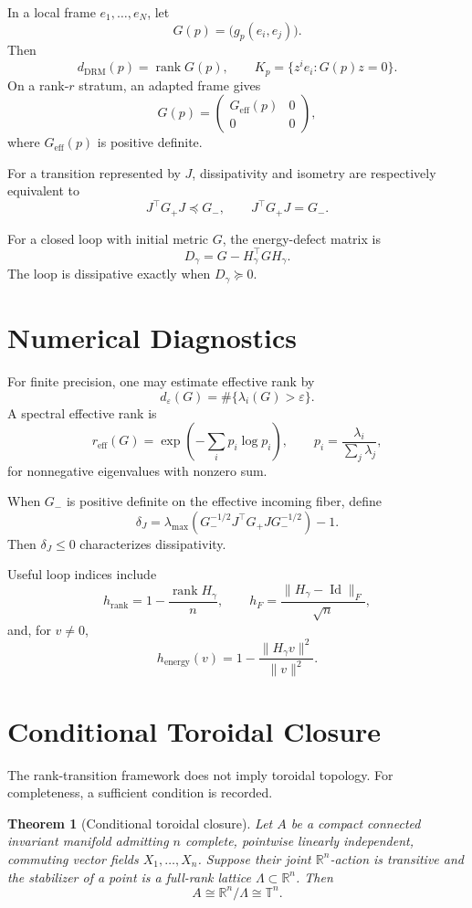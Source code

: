 \documentclass[11pt]{article}
\newtheorem{theorem}{Theorem}[section]
\newcommand{\R}{\mathbb{R}}
\newcommand{\Id}{\operatorname{Id}}
\newcommand{\rank}{\operatorname{rank}}
\begin{document}
In a local frame $e_1,\ldots,e_N$, let
\[
G(p)=\bigl(g_p(e_i,e_j)\bigr).
\]
Then
\[
d_{\mathrm{DRM}}(p)=\rank G(p),
\qquad
K_p=\{z^ie_i:G(p)z=0\}.
\]
On a rank-$r$ stratum, an adapted frame gives
\[
G(p)=\begin{pmatrix}G_{\mathrm{eff}}(p)&0\\0&0\end{pmatrix},
\]
where $G_{\mathrm{eff}}(p)$ is positive definite.

For a transition represented by $J$, dissipativity and isometry are
respectively equivalent to
\[
J^\top G_+J\preceq G_-,
\qquad
J^\top G_+J=G_-.
\]

For a closed loop with initial metric $G$, the energy-defect matrix is
\[
D_\gamma=G-H_\gamma^\top G H_\gamma.
\]
The loop is dissipative exactly when $D_\gamma\succeq0$.

\section{Numerical Diagnostics}

For finite precision, one may estimate effective rank by
\[
d_\varepsilon(G)=\#\{\lambda_i(G)>\varepsilon\}.
\]
A spectral effective rank is
\[
r_{\mathrm{eff}}(G)
=\exp\!\left(-\sum_i p_i\log p_i\right),
\qquad
p_i=\frac{\lambda_i}{\sum_j\lambda_j},
\]
for nonnegative eigenvalues with nonzero sum.

When $G_-$ is positive definite on the effective incoming fiber, define
\[
\delta_J
=\lambda_{\max}\!\left(
G_-^{-1/2}J^\top G_+JG_-^{-1/2}
\right)-1.
\]
Then $\delta_J\le0$ characterizes dissipativity.

Useful loop indices include
\[
h_{\mathrm{rank}}=1-\frac{\rank H_\gamma}{n},
\qquad
h_F=\frac{\|H_\gamma-\Id\|_F}{\sqrt n},
\]
and, for $v\ne0$,
\[
h_{\mathrm{energy}}(v)
=1-\frac{\|H_\gamma v\|^2}{\|v\|^2}.
\]

\section{Conditional Toroidal Closure}

The rank-transition framework does not imply toroidal topology. For
completeness, a sufficient condition is recorded.

\begin{theorem}[Conditional toroidal closure]
Let $A$ be a compact connected invariant manifold admitting $n$ complete,
pointwise linearly independent, commuting vector fields
$X_1,\ldots,X_n$. Suppose their joint $\R^n$-action is transitive and the
stabilizer of a point is a full-rank lattice $\Lambda\subset\R^n$. Then
\[
A\cong\R^n/\Lambda\cong\mathbb T^n.
\]
\end{theorem}
\end{document}
